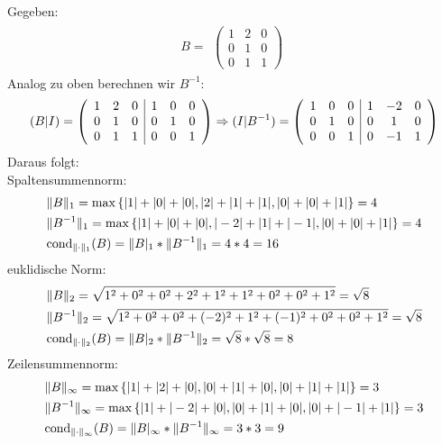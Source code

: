 Gegeben:\\
\begin{align*} 
B=
\begin{split}
\begin{pmatrix}
1 & 2 & 0 \\
0 & 1 & 0 \\
0 & 1 & 1
\end{pmatrix}
\end{split}
\end{align*}
Analog zu oben berechnen wir $B^{-1}$:\\
\begin{align*}
(B|I)=
\begin{split}
\begin{array}({ccc|ccc})
1 & 2 & 0 & 1 & 0 & 0\\
0 & 1 & 0 & 0 & 1 & 0\\
0 & 1 & 1 & 0 & 0 & 1
\end{array}
\Rightarrow(I|B^{-1})=
\begin{array}({ccc|ccc})
1 & 0 & 0 &1 & -2 & 0 \\
0 & 1 & 0 &0 & 1 & 0 \\
0 & 0 & 1 &0 & -1 & 1  
\end{array}
\end{split}
\end{align*}
Daraus folgt:\\
Spaltensummennorm:
\begin{align*}
\begin{split}
&\|B\|_1=\mathrm{max} \left\lbrace|1|+|0|+|0|, |2|+|1|+|1|, |0|+|0|+|1|\right\rbrace = 4\\
&\|B^{-1}\|_1=\mathrm{max} \left\lbrace|1|+|0|+|0|, |-2|+|1|+|-1|, |0|+|0|+|1|\right\rbrace = 4\\
&\mathrm{cond}_{\| \cdot \|_1}(B)=\|B|_1*\|B^{-1}\|_1= 4 * 4 = 16\\
\end{split}
\end{align*}
euklidische Norm:
\begin{align*}
\begin{split}
&\|B\|_2=\sqrt{1^2+0^2+0^2+2^2+1^2+1^2+0^2+0^2+1^2}=\sqrt{8}\\
&\|B^{-1}\|_2=\sqrt{1^2+0^2+0^2+(-2)^2+1^2+(-1)^2+0^2+0^2+1^2}=\sqrt{8}\\
&\mathrm{cond}_{\| \cdot \|_2}(B)=\|B|_2*\|B^{-1}\|_2=\sqrt{8}*\sqrt{8}=8\\
\end{split}
\end{align*}
Zeilensummennorm:
\begin{align*}
\begin{split}
&\|B\|_\infty = \mathrm{max} \left\lbrace|1|+|2|+|0|, |0|+|1|+|0|,|0|+|1|+|1|\right\rbrace = 3\\
&\|B^{-1}\|_\infty = \mathrm{max} \left\lbrace|1|+|-2|+|0|, |0|+|1|+|0|,|0|+|-1|+|1|\right\rbrace = 3\\
&\mathrm{cond}_{\| \cdot \|_\infty}(B)=\|B|_\infty*\|B^{-1}\|_\infty = 3 * 3 = 9\\
\end{split}
\end{align*}